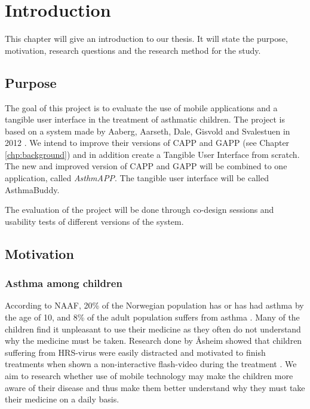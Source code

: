\chapter{Introduction}
\label{chp:introduction}

This chapter will give an introduction to our thesis. It will state the purpose, motivation, research questions and the research method for the study. 

\section{Purpose}
\label{sec:purpose}
The goal of this project is to evaluate the use of mobile applications and a tangible user interface in the treatment of asthmatic children. The project is based on a system made by Aaberg, Aarseth, Dale, Gisvold and Svalestuen in 2012 \cite{CustomerDriven}. We intend to improve their versions of CAPP and GAPP (see Chapter \ref{chp:background}) and in addition create a Tangible User Interface from scratch. The new and improved version of CAPP and GAPP will be combined to one application, called \emph{AsthmAPP}. The tangible user interface will be called AsthmaBuddy.

The evaluation of the project will be done through co-design sessions and usability tests of different versions of the system. 
 



\section{Motivation}
\label{sec:motivation}

\subsection{Asthma among children}
According to NAAF, 20\% of the Norwegian population has or has had asthma by the age of 10, and 8\% of the adult population suffers from asthma \cite{NAAF}. Many of the children find it unpleasant to use their medicine as they often do not understand why the medicine must be taken. Research done by \r{A}sheim showed that children suffering from HRS-virus were easily distracted and motivated to finish treatments when shown a non-interactive flash-video during the treatment \cite{Asheim610877}. We aim to research whether use of mobile technology may make the children more aware of their disease and thus make them better understand why they must take their medicine on a daily basis. 


